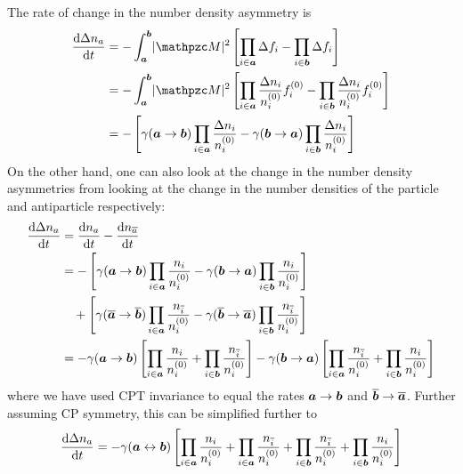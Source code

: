 \documentclass[
  a4paper,             %
  11pt,                %
  oneside,             %
  onecolumn,           %
  bibliography=totoc,  %
  final,               %
]{scrartcl}
\begin{document}
The rate of change in the number density asymmetry is
\begin{equation}
  \begin{aligned}
    \ddfrac{\Delta n_a}{t}
     & = - \int_{\vt a}^{\vt b} \abs{\pzcM}^2 \left[ \prod_{i \in \vt a} \Delta f_i - \prod_{i \in \vt b} \Delta f_i \right]                                                         \\
     & = - \int_{\vt a}^{\vt b} \abs{\pzcM}^2 \left[ \prod_{i \in \vt a} \frac{\Delta n_i}{n_i^{(0)}} f_i^{(0)} - \prod_{i \in \vt b} \frac{\Delta n_i}{n_i^{(0)}} f_i^{(0)} \right] \\
     & = - \left[ \gamma(\vt a \to \vt b) \prod_{i \in \vt a} \frac{\Delta n_i}{n_i^{(0)}} - \gamma(\vt b \to \vt a) \prod_{i \in \vt b} \frac{\Delta n_i}{n_i^{(0)}} \right]
  \end{aligned}
\end{equation}
On the other hand, one can also look at the change in the number density
asymmetries from looking at the change in the number densities of the particle
and antiparticle respectively:
\begin{equation}
  \begin{aligned}
    \frac{\mathop{}\!\mathrm{d}{\Delta n_a}}{\mathop{}\!\mathrm{d}{t}}
     & = \frac{\mathop{}\!\mathrm{d}{n_a}}{\mathop{}\!\mathrm{d}{t}} - \frac{\mathop{}\!\mathrm{d}{n_{\overline a}}}{\mathop{}\!\mathrm{d}{t}}                                                                                                                                                                                  \\
     & = - \left[ \gamma(\boldsymbol{a} \to \boldsymbol{b}) \prod_{i \in \boldsymbol{a}} \frac{n_i}{n_i^{(0)}} - \gamma(\boldsymbol{b} \to \boldsymbol{a}) \prod_{i \in \boldsymbol{b}} \frac{n_i}{n_i^{(0)}} \right]                                                                         \\
     & \quad + \left[ \gamma(\overline{\boldsymbol{a}} \to \overline{\boldsymbol{b}}) \prod_{i \in \boldsymbol{a}} \frac{n_{\overline i}}{n_i^{(0)}} - \gamma(\overline{\boldsymbol{b}} \to \overline{\boldsymbol{a}}) \prod_{i \in \boldsymbol{b}} \frac{n_{\overline i}}{n_i^{(0)}} \right] \\
     & = - \gamma(\boldsymbol{a} \to \boldsymbol{b}) \left[ \prod_{i \in \boldsymbol{a}} \frac{n_i}{n_i^{(0)}} + \prod_{i \in \boldsymbol{b}} \frac{n_{\overline i}}{n_i^{(0)}} \right]
    - \gamma(\boldsymbol{b} \to \boldsymbol{a}) \left[ \prod_{i \in \boldsymbol{a}} \frac{n_{\overline i}}{n_i^{(0)}} + \prod_{i \in \boldsymbol{b}} \frac{n_i}{n_i^{(0)}} \right]
  \end{aligned}
\end{equation}
where we have used \gls{CPT} invariance to equal the rates \(\boldsymbol{a} \to
\boldsymbol{b}\) and \(\overline{\boldsymbol{b}} \to \overline{\boldsymbol{a}}\).  Further assuming
\gls{CP} symmetry, this can be simplified further to
\begin{equation}
  \frac{\mathop{}\!\mathrm{d}{\Delta n_a}}{\mathop{}\!\mathrm{d}{t}} = - \gamma(\boldsymbol{a} \leftrightarrow \boldsymbol{b}) \left[ \prod_{i \in \boldsymbol{a}} \frac{n_i}{n_i^{(0)}} + \prod_{i \in \boldsymbol{a}} \frac{n_{\overline i}}{n_i^{(0)}} + \prod_{i \in \boldsymbol{b}} \frac{n_{\overline i}}{n_i^{(0)}} + \prod_{i \in \boldsymbol{b}} \frac{n_i}{n_i^{(0)}} \right]
\end{equation}
\end{document}
